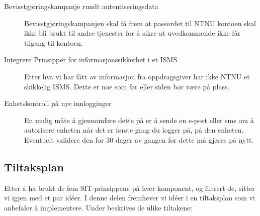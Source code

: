 \begin{description}
\item[Bevisstgjøringskampanje rundt autentiseringsdata]
Bevisstgjøringskampanjen skal få frem at passordet til NTNU kontoen skal ikke bli brukt til andre tjenester for å sikre at uvedkommende ikke får tilgang til kontoen.

\item[Integrere Prinsipper for informasjonssikkerhet i et ISMS]
Etter hva vi har fått av informasjon fra oppdragsgiver har ikke NTNU et skikkelig ISMS. Dette er noe som før eller siden bør være på plass. 

\item[Enhetskontroll på nye innlogginger]
En mulig måte å gjennomføre dette på er å sende en e-post eller sms om å autorisere enheten når det er første gang du logger på, på den enheten. Eventuelt validere den for 30 dager av gangen før dette må gjøres på nytt. 
\end{description}

\subsection{Tiltaksplan}
Etter å ha brukt de fem SIT-prinsippene på hver komponent, og filtrert de, sitter vi igjen med et par idéer. I denne delen fremhever vi idéer i en tiltaksplan som vi anbefaler å implementere. 
Under beskrives de ulike tiltakene:


